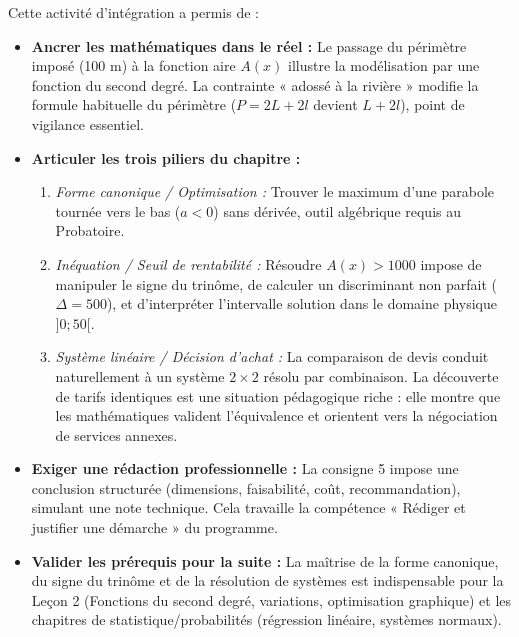\documentclass[11pt]{article}
\newcounter{popsec}
\newcounter{popsub}
\newcommand{\courssub}[1]{%
  \stepcounter{popsub}%
  \par\vspace{9pt}\noindent{\popxbold\fontsize{11.5}{13}\selectfont\color{popink}{\color{poporange}\thepopsec.\thepopsub}\hspace{6pt}#1}\par\nopagebreak\vspace{4pt}
}
\begin{document}
\courssub{Bilan de l'activité}
Cette activité d'intégration a permis de :
\begin{itemize}
    \item \textbf{Ancrer les mathématiques dans le réel :} Le passage du périmètre imposé (100 m) à la fonction aire $A(x)$ illustre la modélisation par une fonction du second degré. La contrainte « adossé à la rivière » modifie la formule habituelle du périmètre ($P = 2L+2l$ devient $L+2l$), point de vigilance essentiel.
    \item \textbf{Articuler les trois piliers du chapitre :}
    \begin{enumerate}
        \item \emph{Forme canonique / Optimisation :} Trouver le maximum d'une parabole tournée vers le bas ($a<0$) sans dérivée, outil algébrique requis au Probatoire.
        \item \emph{Inéquation / Seuil de rentabilité :} Résoudre $A(x) > 1000$ impose de manipuler le signe du trinôme, de calculer un discriminant non parfait ($\Delta=500$), et d'interpréter l'intervalle solution dans le domaine physique $]0;50[$.
        \item \emph{Système linéaire / Décision d'achat :} La comparaison de devis conduit naturellement à un système $2 \times 2$ résolu par combinaison. La découverte de tarifs identiques est une situation pédagogique riche : elle montre que les mathématiques valident l'équivalence et orientent vers la négociation de services annexes.
    \end{enumerate}
    \item \textbf{Exiger une rédaction professionnelle :} La consigne 5 impose une conclusion structurée (dimensions, faisabilité, coût, recommandation), simulant une note technique. Cela travaille la compétence « Rédiger et justifier une démarche » du programme.
    \item \textbf{Valider les prérequis pour la suite :} La maîtrise de la forme canonique, du signe du trinôme et de la résolution de systèmes est indispensable pour la Leçon 2 (Fonctions du second degré, variations, optimisation graphique) et les chapitres de statistique/probabilités (régression linéaire, systèmes normaux).
\end{itemize}
\end{document}
